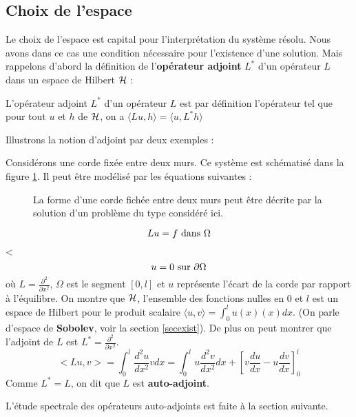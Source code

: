 \documentclass[12pt]{book}
\begin{document}
\subsection{Choix de l'espace}\label{secchoixesp}
Le choix de l'espace est capital pour l'interpr\'etation du syst\`eme
r\'esolu.
Nous avons dans ce cas une condition n\'ecessaire pour l'existence d'une
solution. Mais rappelons d'abord la d\'efinition de l'{\bf op\'erateur
  adjoint} $L^*$ d'un 
op\'erateur $L$ dans un espace de Hilbert $\cal H$ :
\begin{defn} L'op\'erateur
  adjoint $L^*$ d'un op\'erateur $L$ est par d\'efinition l'op\'erateur tel
  que pour tout $u$ et $h$ de 
$\cal H$, on a $ \langle Lu,h\rangle = \langle u,L^*h\rangle $
\end{defn}
Illustrons la notion d'adjoint par deux exemples :
\begin{exmp}
Consid\'erons une corde fix\'ee entre deux murs. Ce syst\`eme est
sch\'ematis\'e dans la figure 
\ref{figcordef}. Il peut \^etre mod\'elis\'e par les \'equations suivantes :
\begin{figure}[htb]
 \centerline{}   
 \caption{La forme d'une corde fich\'ee entre deux murs peut \^etre
d\'ecrite par la solution 
d'un probl\`eme du type consid\'er\'e ici.}
 \label{figcordef}
\end{figure}
\begin{equation}
Lu=f\ {\rm dans}\ \Omega
\end{equation}
<\begin{equation}
u=0\ {\rm sur}\ \partial\Omega
\end{equation}
o\`u $L=\frac{\partial^{2}}{\partial x^{2}}$, $\Omega$ est le segment $[0,l]$
et $u$ repr\'esente l'\'ecart de la corde par rapport \`a l'\'equilibre. 
On montre que 
$\cal H$,
l'ensemble des fonctions nulles en $0$ et $l$ est un espace de Hilbert
pour le produit scalaire $\langle u,v \rangle=\int_0^lu(x)(x) dx$.
(On parle d'espace de {\bf Sobolev}, voir la section \ref{secexist}).
De plus on peut montrer que l'adjoint de $L$ est 
 $L^*=\frac{\partial^{2}}{\partial x^{2}}$.
\begin{equation}\label{eqadjoimq}
<Lu,v>=\int_0^l \frac{d^2u}{dx^2}vdx=
\int_0^lu\frac{d^2v}{dx^2}dx+[v\frac{du}{dx}-u\frac{dv}{dx}]^l_0 
\end{equation}
Comme $L^*=L$, on dit que $L$ est {\bf auto-adjoint}.
\end{exmp}
\begin{rem}
L'\'etude spectrale des op\'erateurs auto-adjoints est faite \`a la section
suivante. 
\end{rem}
\end{document}
